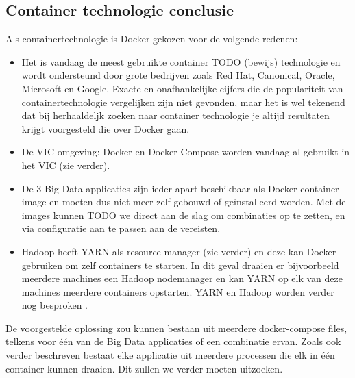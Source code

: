 \subsection{Container technologie conclusie}
Als containertechnologie is Docker gekozen voor de volgende redenen:
\newline
\begin{itemize}
    \item Het is vandaag de meest gebruikte container TODO (bewijs) technologie en wordt ondersteund door grote bedrijven zoals Red Hat, Canonical, Oracle, Microsoft en Google. Exacte en onafhankelijke cijfers die de populariteit van containertechnologie vergelijken zijn niet gevonden, maar het is wel tekenend dat bij herhaaldeljk zoeken naar container technologie je altijd resultaten krijgt voorgesteld die over Docker gaan.
    \item De VIC omgeving: Docker en Docker Compose worden vandaag al gebruikt in het VIC (zie verder).
    \item De 3 Big Data applicaties zijn ieder apart beschikbaar als Docker container image en moeten dus niet meer zelf gebouwd of geïnstalleerd worden. Met de images kunnen TODO we direct aan de slag om combinaties op te zetten, en via configuratie aan te passen aan de vereisten.
    \item Hadoop heeft YARN als resource manager (zie verder) en deze kan Docker gebruiken om zelf containers te starten. In dit geval draaien er bijvoorbeeld meerdere machines een Hadoop nodemanager en kan YARN op elk van deze machines meerdere containers opstarten. YARN en Hadoop worden verder nog besproken \autocite{Hadoop2023a}.
\end{itemize}

De voorgestelde oplossing zou kunnen bestaan uit meerdere docker-compose files, telkens voor één van de Big Data applicaties of een combinatie ervan. Zoals ook verder beschreven bestaat elke applicatie uit meerdere processen die elk in één container kunnen draaien. Dit zullen we verder moeten uitzoeken.
\newline
\newline

